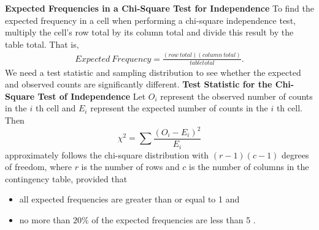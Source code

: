 \documentclass{report}
\begin{document}
        \bigbreak \noindent 
        \textbf{Expected Frequencies in a Chi-Square Test for Independence}
        \bigbreak \noindent 
        To find the expected frequency in a cell when performing a chi-square independence test, multiply the cell's row total by its column total and divide this result by the table total. That is,
        \bigbreak \noindent 
        \begin{align*}
            Expected\ Frequency = \frac{(row\ total)(column\ total)}{table total}
        .\end{align*}
        \bigbreak \noindent 
        We need a test statistic and sampling distribution to see whether the expected and observed counts are significantly different.
        \pagebreak \bigbreak \noindent 
        \textbf{Test Statistic for the Chi-Square Test of Independence}
        \bigbreak \noindent 
        Let $O_i$ represent the observed number of counts in the $i$ th cell and $E_i$ represent the expected number of counts in the $i$ th cell. Then
        $$
        \chi^2=\sum \frac{\left(O_i-E_i\right)^2}{E_i}
        $$
        \bigbreak \noindent 
        approximately follows the chi-square distribution with $(r-1)(c-1)$ degrees of freedom, where $r$ is the number of rows and $c$ is the number of columns in the contingency table, provided that
        \begin{itemize}
            \item  all expected frequencies are greater than or equal to 1 and
            \item  no more than $20 \%$ of the expected frequencies are less than 5 .
        \end{itemize}
\end{document}
